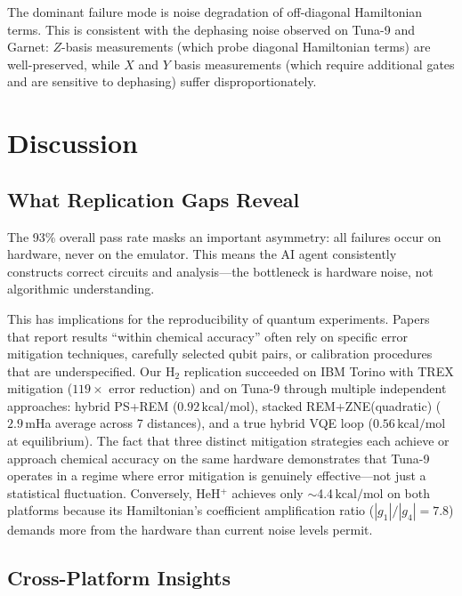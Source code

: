\documentclass[twocolumn,prl,superscriptaddress,nofootinbib]{revtex4-2}
\newcommand{\kcalmol}{\,\text{kcal/mol}}
\begin{document}
The dominant failure mode is noise degradation of off-diagonal Hamiltonian terms.
This is consistent with the dephasing noise observed on Tuna-9 and Garnet: $Z$-basis measurements (which probe diagonal Hamiltonian terms) are well-preserved, while $X$ and $Y$ basis measurements (which require additional gates and are sensitive to dephasing) suffer disproportionately.

\section{Discussion}
\label{sec:discussion}

\subsection{What Replication Gaps Reveal}

The 93\% overall pass rate masks an important asymmetry: all failures occur on hardware, never on the emulator.
This means the AI agent consistently constructs correct circuits and analysis---the bottleneck is hardware noise, not algorithmic understanding.

This has implications for the reproducibility of quantum experiments.
Papers that report results ``within chemical accuracy'' often rely on specific error mitigation techniques, carefully selected qubit pairs, or calibration procedures that are underspecified.
Our H$_2$ replication succeeded on IBM Torino with TREX mitigation ($119\times$ error reduction) and on Tuna-9 through multiple independent approaches: hybrid PS+REM ($0.92\kcalmol$), stacked REM+ZNE(quadratic) ($2.9$\,mHa average across 7 distances), and a true hybrid VQE loop ($0.56\kcalmol$ at equilibrium).
The fact that three distinct mitigation strategies each achieve or approach chemical accuracy on the same hardware demonstrates that Tuna-9 operates in a regime where error mitigation is genuinely effective---not just a statistical fluctuation.
Conversely, HeH$^+$ achieves only $\sim$4.4$\kcalmol$ on both platforms because its Hamiltonian's coefficient amplification ratio ($|g_1|/|g_4| = 7.8$) demands more from the hardware than current noise levels permit.

\subsection{Cross-Platform Insights}
\end{document}
